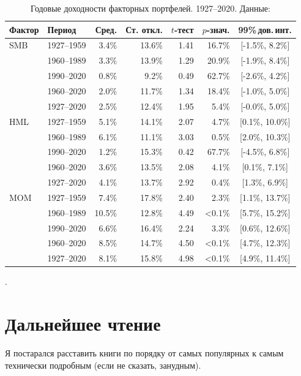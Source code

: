 \begin{table}[h]
\centering
\begin{tabular}{l|l|r|r|r|r|c}
Фактор & Период & Сред. & Ст. откл. & $t$-тест & $p$-знач. & 99\%\,дов.\,инт. \\
\hline
SMB & 1927--1959 &  3.4\% & 13.6\% & 1.41 & 16.7\% & [-1.5\%, 8.2\%] \\
    & 1960--1989 &  3.3\% & 13.9\% & 1.29 & 20.9\% & [-1.9\%, 8.4\%] \\
    & 1990--2020 &  0.8\% & 9.2\%  & 0.49 & 62.7\% & [-2.6\%, 4.2\%] \\
    & 1960--2020 &  2.0\% & 11.7\% & 1.34 & 18.4\% & [-1.0\%, 5.0\%] \\
    & 1927--2020 &  2.5\% & 12.4\% & 1.95 &  5.4\% & [-0.0\%, 5.0\%] \\ \hline

HML & 1927--1959 &  5.1\% & 14.1\% & 2.07 &  4.7\% & [0.1\%, 10.0\%] \\
    & 1960--1989 &  6.1\% & 11.1\% & 3.03 &  0.5\% & [2.0\%, 10.3\%] \\
    & 1990--2020 &  1.2\% & 15.3\% & 0.42 & 67.7\% & [-4.5\%, 6.8\%] \\
    & 1960--2020 &  3.6\% & 13.5\% & 2.08 &  4.1\% & [0.1\%, 7.1\%]  \\
    & 1927--2020 &  4.1\% & 13.7\% & 2.92 &  0.4\% & [1.3\%, 6.9\%]  \\ \hline
  
MOM & 1927--1959 &  7.4\% & 17.8\% & 2.40 &  2.3\% & [1.1\%, 13.7\%] \\
    & 1960--1989 & 10.5\% & 12.8\% & 4.49 & <0.1\% & [5.7\%, 15.2\%] \\
    & 1990--2020 &  6.6\% & 16.4\% & 2.24 &  3.3\% & [0.6\%, 12.6\%] \\
    & 1960--2020 &  8.5\% & 14.7\% & 4.50 & <0.1\% & [4.7\%, 12.3\%] \\
    & 1927--2020 &  8.1\% & 15.8\% & 4.98 & <0.1\% & [4.9\%, 11.4\%] \\
\end{tabular}
\caption{Годовые доходности факторных портфелей. 1927--2020. Данные: \cite{kennethFrench}}.
\label{us_factor_returns_table}
\end{table}

\section*{Дальнейшее чтение}

Я постарался расставить книги по порядку от самых популярных к самым технически подробным (если не сказать, занудным).

